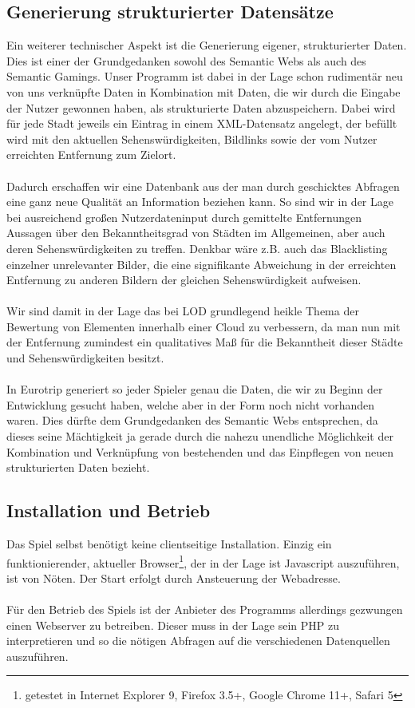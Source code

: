 \documentclass[a4paper, 11pt]{article}
\begin{document}
\subsection{Generierung strukturierter Datensätze}
\label{sec:gen-struk-daten}
Ein weiterer technischer Aspekt ist die Generierung eigener, strukturierter Daten. Dies ist einer der Grundgedanken sowohl des Semantic Webs als auch des Semantic Gamings. Unser Programm ist dabei in der Lage schon rudimentär neu von uns verknüpfte Daten in Kombination mit Daten, die wir durch die Eingabe der Nutzer gewonnen haben, als strukturierte Daten abzuspeichern. Dabei wird für jede Stadt jeweils ein Eintrag in einem XML-Datensatz angelegt, der befüllt wird mit den aktuellen Sehenswürdigkeiten, Bildlinks sowie der vom Nutzer erreichten Entfernung zum Zielort.\\\\ Dadurch erschaffen wir eine Datenbank aus der man durch geschicktes Abfragen eine ganz neue Qualität an Information beziehen kann. So sind wir in der Lage bei ausreichend großen Nutzerdateninput durch gemittelte Entfernungen Aussagen über den Bekanntheitsgrad von Städten im Allgemeinen, aber auch deren Sehenswürdigkeiten zu treffen. Denkbar wäre z.B. auch das Blacklisting einzelner unrelevanter Bilder, die eine signifikante Abweichung in der erreichten Entfernung zu anderen Bildern der gleichen Sehenswürdigkeit aufweisen.\\\\
Wir sind damit in der Lage das bei LOD grundlegend heikle Thema der Bewertung von Elementen innerhalb einer Cloud zu verbessern, da man nun mit der Entfernung zumindest ein qualitatives Maß für die Bekanntheit dieser Städte und Sehenswürdigkeiten besitzt.\\\\
In Eurotrip generiert so jeder Spieler genau die Daten, die wir zu Beginn der Entwicklung gesucht haben, welche aber in der Form noch nicht vorhanden waren. Dies dürfte dem Grundgedanken des Semantic Webs entsprechen, da dieses seine Mächtigkeit ja gerade durch die nahezu unendliche Möglichkeit der Kombination und Verknüpfung von bestehenden und das Einpflegen von neuen strukturierten Daten bezieht.
\subsection{Installation und Betrieb}
Das Spiel selbst benötigt keine clientseitige Installation. Einzig ein funktionierender, aktueller Browser\footnote{getestet in Internet Explorer 9, Firefox 3.5+, Google Chrome 11+, Safari 5}, der in der Lage ist Javascript auszuführen, ist von Nöten. Der Start erfolgt durch Ansteuerung der Webadresse.\\\\
Für den Betrieb des Spiels ist der Anbieter des Programms allerdings gezwungen einen Webserver zu betreiben. Dieser muss in der Lage sein PHP zu interpretieren und so die nötigen Abfragen auf die verschiedenen Datenquellen auszuführen.
\newpage
\end{document}
